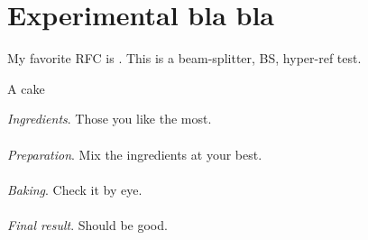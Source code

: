  
\chapter{Experimental bla bla}

My favorite RFC is \cite{rfc2549}. This is a beam-splitter, \ac{BS}, hyper-ref test.\\

\noindent\blindtext[5]
\begin{protocol}{A cake}
\rule{0pt}{3ex}\textit{Ingredients}. Those you like the most.\\
\\
\textit{Preparation}. Mix the ingredients at your best.\\
\\
\textit{Baking}. Check it by eye.\\
\\
\textit{Final result}. Should be good.
\end{protocol}
